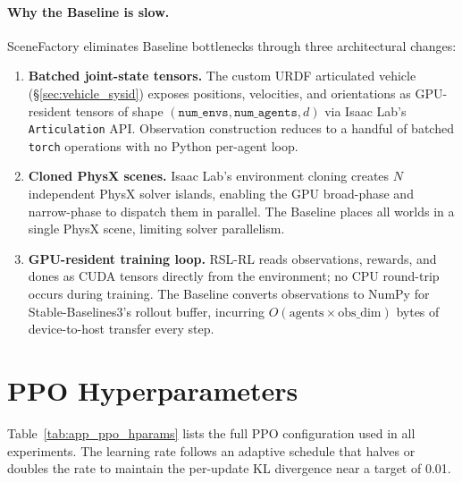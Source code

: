 \paragraph{Why the Baseline is slow.}
SceneFactory eliminates Baseline bottlenecks through three architectural changes:
\begin{enumerate}[leftmargin=*, itemsep=2pt]
  \item \textbf{Batched joint-state tensors.}
        The custom URDF articulated vehicle (\S\ref{sec:vehicle_sysid}) exposes positions, velocities, and orientations as GPU-resident tensors of shape $(\texttt{num\_envs}, \texttt{num\_agents}, d)$ via Isaac Lab's \texttt{Articulation} API.
        Observation construction reduces to a handful of batched \texttt{torch} operations with no Python per-agent loop.
  \item \textbf{Cloned PhysX scenes.}
        Isaac Lab's environment cloning creates $N$ independent PhysX solver islands, enabling the GPU broad-phase and narrow-phase to dispatch them in parallel.
        The Baseline places all worlds in a single PhysX scene, limiting solver parallelism.
  \item \textbf{GPU-resident training loop.}
        RSL-RL reads observations, rewards, and dones as CUDA tensors directly from the environment; no CPU round-trip occurs during training.
        The Baseline converts observations to NumPy for Stable-Baselines3's rollout buffer, incurring $O(\text{agents} \times \text{obs\_dim})$ bytes of device-to-host transfer every step.
\end{enumerate}


\section{PPO Hyperparameters}
\label{app:ppo_hparams}

Table~\ref{tab:app_ppo_hparams} lists the full PPO configuration used in all experiments.
The learning rate follows an adaptive schedule that halves or doubles the rate to maintain the per-update KL divergence near a target of 0.01.

